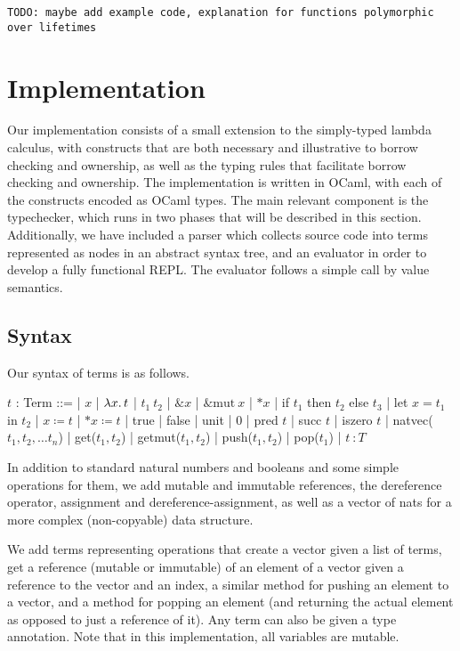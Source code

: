\documentclass[letterpaper,11pt]{article}
\begin{document}
\texttt{TODO: maybe add example code, explanation for functions polymorphic over lifetimes}

\section{Implementation}
Our implementation consists of a small extension to the simply-typed lambda calculus,
with constructs that are both necessary and illustrative to borrow checking and ownership,
as well as the typing rules that facilitate borrow checking and ownership. The
implementation is written in OCaml, with each of the constructs encoded as
OCaml types. The main relevant component is the typechecker, which runs in two
phases that will be described in this section. Additionally, we have included a
parser which collects source code into terms represented as nodes in an abstract syntax tree, 
and an evaluator in order to develop a fully functional REPL. The evaluator follows a simple
call by value semantics.

\subsection{Syntax}
Our syntax of terms is as follows.
\begin{center}
    \begin{bnf}
        $t$ : \textsf{Term} ::=
        | $x$ | $\lambda x\ldotp t$ | $t_1\ t_2$ | $\&x$ | $\&\text{mut}\ x$ | $*x$
        | if $t_1$ then $t_2$ else $t_3$
        | let $x = t_1$ in $t_2$
        | $x \coloneq t$
        | $*x \coloneq t$
        | true
        | false
        | unit
        | 0
        | pred $t$
        | succ $t$
        | iszero $t$
        | natvec($t_1,t_2,\dots t_n$)
        | get($t_1,t_2$)
        | getmut($t_1,t_2$)
        | push($t_1,t_2$)
        | pop($t_1$) 
        | $t\ \colon T$
    \end{bnf}
\end{center}
In addition to standard natural numbers and booleans and some simple operations for them, we add
mutable and immutable references, the dereference operator, assignment and
dereference-assignment, as well as a vector of nats for a more complex
(non-copyable) data structure. 

We add terms representing operations that create a vector given a list of terms, 
get a reference (mutable or immutable) of an element of a vector given a reference to the vector and an index, 
a similar method for pushing an element to a vector, and a method for popping an element
(and returning the actual element as opposed to just a reference of it). Any term can also be given a type annotation.
Note that in this implementation, all variables are mutable.
\end{document}
